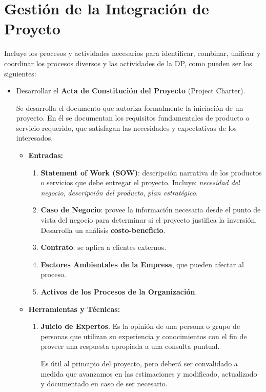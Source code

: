 \documentclass[10pt,a4paper]{article}
\begin{document}
\section{Gestión de la Integración de Proyeto}

Incluye los procesos y actividades necesarios para identificar, combinar, unificar y coordinar los procesos diversos y las actividades de la DP, como pueden ser los siguientes:
\begin{itemize}
\item Desarrollar el \textbf{Acta de Constitución del Proyecto} (Project Charter).

Se desarrolla el documento que autoriza formalmente la iniciación de un proyecto. En él se documentan los requisitos fundamentales de producto o servicio requerido, que satisfagan las necesidades y expectativas de los interesados.

\begin{itemize}
\item \textbf{Entradas:}
\begin{enumerate}
\item \textbf{Statement of Work (SOW)}: descripción narrativa de los productos o servicios que debe entregar el proyecto. Incluye: \textit{necesidad del negocio}, \textit{descripción del producto}, \textit{plan estratégico}.
\item \textbf{Caso de Negocio}: provee la información necesaria desde el punto de vista del negocio para determinar si el proyecto justifica la inversión. Desarrolla un análisis \textbf{costo-beneficio}.
\item \textbf{Contrato}: se aplica a clientes externos.
\item \textbf{Factores Ambientales de la Empresa}, que pueden afectar al proceso.
\item \textbf{Activos de los Procesos de la Organización}.
\end{enumerate}

\item \textbf{Herramientas y Técnicas:}
\begin{enumerate}
\item \textbf{Juicio de Expertos}. Es la opinión de una persona o grupo de personas que utilizan su experiencia y conocimientos con el fin de proveer una respuesta apropiada a una consulta puntual.

Es útil al principio del proyecto, pero deberá ser convalidado a medida que avanzamos en las estimaciones y modificado, actualizado y documentado en caso de ser necesario.
\end{enumerate}


\end{itemize}
\end{itemize}
\end{document}
